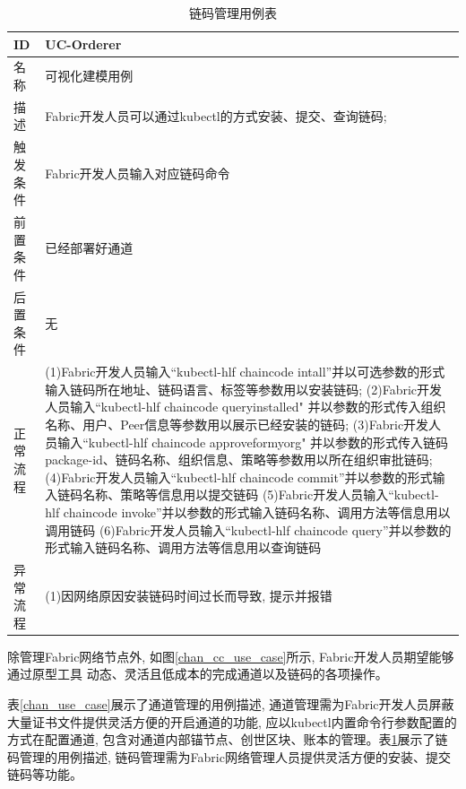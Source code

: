 {\footnotesize
\begin{longtable}[h]{m{60pt}|m{280pt}}
    \caption[链码管理用例表]{链码管理用例表} \label{cc_use_case} \\
        \hline  
        ID&UC-Orderer\\
        \hline
        名称&可视化建模用例\\
        \hline
        描述&Fabric开发人员可以通过kubectl的方式安装、提交、查询链码;\\
        \hline
        触发条件&Fabric开发人员输入对应链码命令\\
        \hline
        前置条件&已经部署好通道\\
        \hline
        后置条件&无\\
        \hline
        正常流程& (1)Fabric开发人员输入“kubectl-hlf chaincode intall”并以可选参数的形式输入链码所在地址、链码语言、标签等参数用以安装链码;
        \newline (2)Fabric开发人员输入“kubectl-hlf chaincode queryinstalled" 并以参数的形式传入组织名称、用户、Peer信息等参数用以展示已经安装的链码;
         \newline (3)Fabric开发人员输入“kubectl-hlf chaincode approveformyorg" 并以参数的形式传入链码package-id、链码名称、组织信息、策略等参数用以所在组织审批链码;
        \newline (4)Fabric开发人员输入“kubectl-hlf chaincode commit”并以参数的形式输入链码名称、策略等信息用以提交链码
        \newline (5)Fabric开发人员输入“kubectl-hlf chaincode invoke”并以参数的形式输入链码名称、调用方法等信息用以调用链码
        \newline (6)Fabric开发人员输入“kubectl-hlf chaincode query”并以参数的形式输入链码名称、调用方法等信息用以查询链码\\
        \hline 
        异常流程& (1)因网络原因安装链码时间过长而导致, 提示并报错\\
        \hline
    \end{longtable} 
}

除管理Fabric网络节点外, 如图\ref{chan_cc_use_case}所示, Fabric开发人员期望能够通过原型工具
动态、灵活且低成本的完成通道以及链码的各项操作。

表\ref{chan_use_case}展示了通道管理的用例描述, 通道管理需为Fabric开发人员屏蔽大量证书文件提供灵活方便的开启通道的功能, 应以kubectl内置命令行参数配置的方式在配置通道, 包含对通道内部锚节点、创世区块、账本的管理。表\ref{cc_use_case}展示了链码管理的用例描述, 链码管理需为Fabric网络管理人员提供灵活方便的安装、提交链码等功能。


